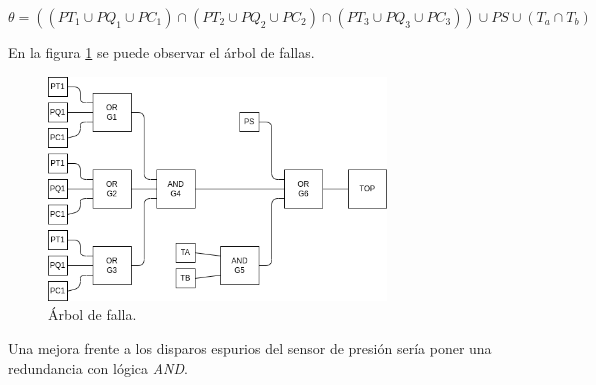 \documentclass[
    11pt,
    spanish,
    a4paper
]{article}
\begin{document}
$$ \theta = ((PT_1 \cup PQ_1 \cup PC_1) \cap (PT_2 \cup PQ_2 \cup PC_2) \cap (PT_3 \cup PQ_3 \cup PC_3)) \cup PS \cup (T_a \cap T_b) $$

En la figura \ref{fig:arbol} se puede observar el árbol de fallas.

\begin{figure}[htbp]
	\centering
	\includegraphics[width=0.8\textwidth]{img/arbol.png}
	\caption{Árbol de falla.}
	\label{fig:arbol}
\end{figure}

Una mejora frente a los disparos espurios del sensor de presión sería poner una redundancia con lógica \emph{AND}.
\end{document}
